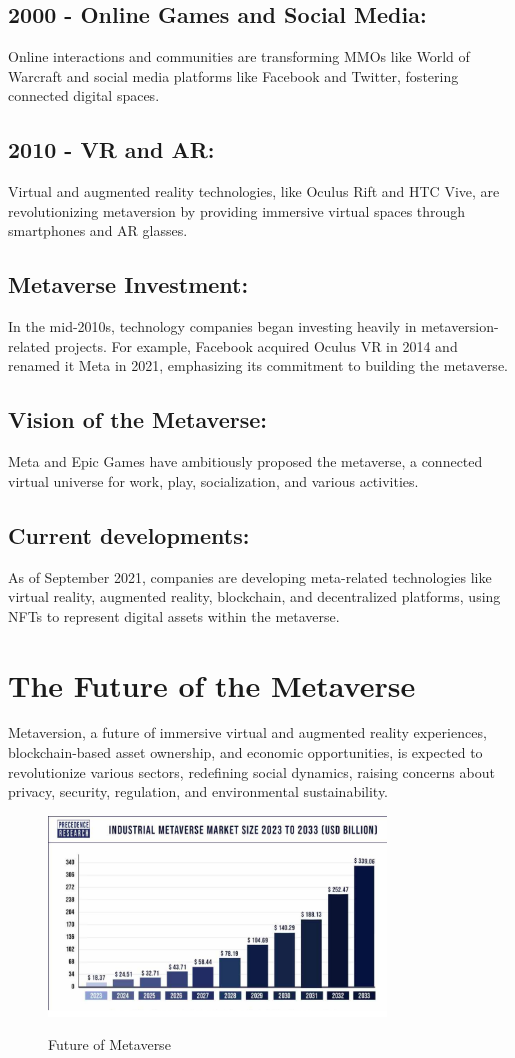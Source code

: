 \subsection{2000 - Online Games and Social Media:}
Online interactions and communities are transforming MMOs like World of Warcraft and social media platforms like Facebook and Twitter, fostering connected digital spaces.
\subsection{2010 - VR and AR:}
Virtual and augmented reality technologies, like Oculus Rift and HTC Vive, are revolutionizing metaversion by providing immersive virtual spaces through smartphones and AR glasses.
\subsection{Metaverse Investment:}
In the mid-2010s, technology companies began investing heavily in metaversion-related projects. For example, Facebook acquired Oculus VR in 2014 and renamed it Meta in 2021, emphasizing its commitment to building the metaverse.
\subsection{Vision of the Metaverse:}
Meta and Epic Games have ambitiously proposed the metaverse, a connected virtual universe for work, play, socialization, and various activities.
\subsection{Current developments:}
As of September 2021, companies are developing meta-related technologies like virtual reality, augmented reality, blockchain, and decentralized platforms, using NFTs to represent digital assets within the metaverse.
\section{The Future of the Metaverse}
Metaversion, a future of immersive virtual and augmented reality experiences, blockchain-based asset ownership, and economic opportunities, is expected to revolutionize various sectors, redefining social dynamics, raising concerns about privacy, security, regulation, and environmental sustainability.
\begin{figure}[h]
    \centering
    \includegraphics[width=0.8\textwidth, height=0.3\textheight]{Images/industrial-metaverse-market-size.png}
    \caption{Future of Metaverse}
    \label{fig:Future of Metaverse}\cite{metaverse-market}
\end{figure}
